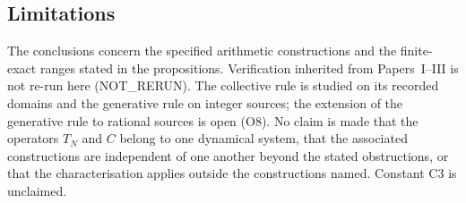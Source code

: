 \subsection{Limitations}\label{sec:limitations}
The conclusions concern the specified arithmetic constructions and the finite-exact ranges stated in the propositions. Verification inherited from Papers~I--III is not re-run here (NOT\_RERUN). The collective rule is studied on its recorded domains and the generative rule on integer sources; the extension of the generative rule to rational sources is open (O8). No claim is made that the operators $T_N$ and $C$ belong to one dynamical system, that the associated constructions are independent of one another beyond the stated obstructions, or that the characterisation applies outside the constructions named. Constant C3 is unclaimed.
